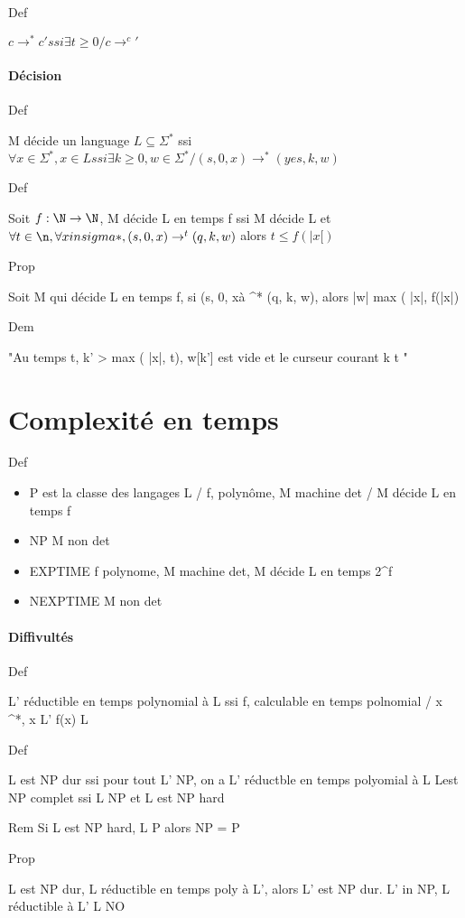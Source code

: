 \documentclass[10pt,a4paper]{article}
\begin{document}
\subparagraph*{Def}
 $c \rightarrow^* c' ssi \exists t \geq 0 / c \rightarrow^ c'$
 
\subsection{Décision} 
 \subparagraph*{Def} M décide un language $L \subseteq \Sigma^*$ ssi $\forall x \in \Sigma^*, x \in L ssi \exists k \geq 0, w \in \Sigma^* / (s, 0, x) \rightarrow^* (yes, k, w)$
 
 \subparagraph*{Def} Soit $f : \N \rightarrow \N$, M décide L en temps f ssi M décide L et $\forall t \in \n, \forall x in sigma*, (s, 0, x) \rightarrow ^t (q, k, w)$ alors $t \leq f(|x[)$
 
 \subparagraph*{Prop} Soit M qui décide L en temps f, si (s, 0, xà \rightarrow^* (q, k, w), alors |w| \leq max ( |x|, f(|x|)
 
 \subparagraph*{Dem} "Au temps t, \forall k' > max ( |x|, t), w[k'] est vide et le curseur courant k \leq t "
 
 \part{Complexité en temps}
 
 \subparagraph*{Def} \begin{itemize}
 \item P est la classe des langages L / \exists f, polynôme, M machine det / M décide L en temps f
\item NP M non det
\item EXPTIME f polynome, M machine det, M décide L en temps 2^f 
 \item NEXPTIME M non det
 \end{itemize}
 
 \subsection{Diffivultés}
 \subparagraph*{Def} L' réductible en temps polynomial à L ssi \exists f, calculable en temps polnomial / \exits x \in \Sigma ^*, x \in L' \equiv f(x) \in L
 
 \subparagraph*{Def} L est NP dur ssi pour tout L' \in NP, on a L' réductble en temps polyomial à L
 Lest NP complet ssi L \in NP et L est NP hard
 
 Rem Si L est NP hard, L \in P alors NP = P
 
 \subparagraph*{Prop} L est NP dur, L réductible en temps poly à L', alors L' est NP dur.
 L' in NP, L réductible à L' \impl L \in NO
 
\end{document}

